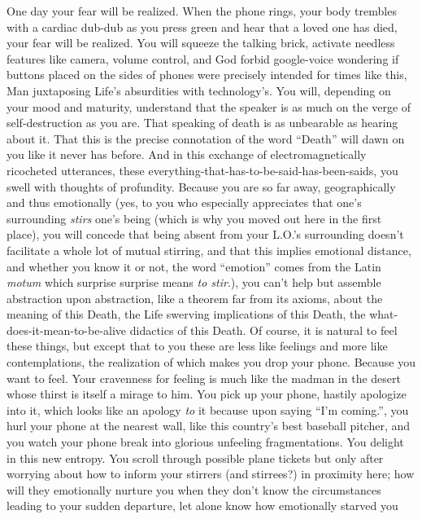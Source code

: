 \documentclass{article}
\begin{document}
\newline

One day your fear will be realized. When the phone rings, your body
trembles with a cardiac dub-dub as you press green and hear that a loved
one has died, your fear will be realized. You will squeeze the talking
brick, activate needless features like camera, volume control, and God
forbid google-voice wondering if buttons placed on the sides of phones
were precisely intended for times like this, Man juxtaposing Life's
absurdities with technology's. You will, depending on your mood and
maturity, understand that the speaker is as much on the verge of
self-destruction as you are. That speaking of death is as unbearable as
hearing about it. That this is the precise connotation of the word
``Death'' will dawn on you like it never has before. And in this
exchange of electromagnetically ricocheted utterances, these
everything-that-has-to-be-said-has-been-saids, you swell with thoughts
of profundity. Because you are so far away, geographically and thus
emotionally (yes, to you who especially appreciates that one's
surrounding \textit{stirs} one's being (which is why you moved out here
in the first place), you will concede that being absent from your L.O.'s
surrounding doesn't facilitate a whole lot of mutual stirring, and that
this implies emotional distance, and whether you know it or not, the
word ``emotion'' comes from the Latin \textit{motum} which surprise
surprise means \textit{to stir}.), you can't help but assemble
abstraction upon abstraction, like a theorem far from its axioms, about
the meaning of this Death, the Life swerving implications of this Death,
the what-does-it-mean-to-be-alive didactics of this Death. Of course, it
is natural to feel these things, but except that to you these are less
like feelings and more like contemplations, the realization of which
makes you drop your phone. Because you want to feel. Your cravenness for
feeling is much like the madman in the desert whose thirst is itself
a mirage to him. You pick up your phone, hastily apologize into it,
which looks like an apology \textit{to} it because upon saying ``I'm
coming.'', you hurl your phone at the nearest wall, like this country's
best baseball pitcher, and you watch your phone break into glorious
unfeeling fragmentations. You delight in this new entropy. You scroll
through possible plane tickets but only after worrying about how to
inform your stirrers (and stirrees?) in proximity here; how will they
emotionally nurture you when they don't know the circumstances leading
to your sudden departure, let alone know how emotionally starved you
\end{document}
